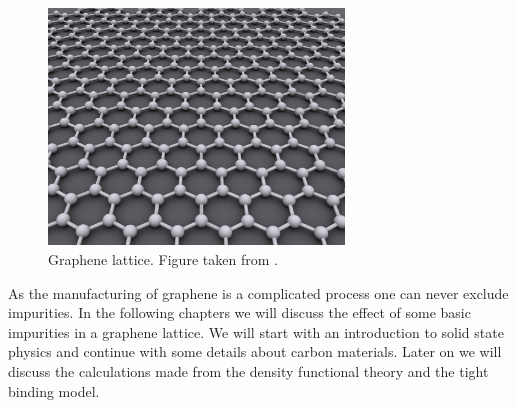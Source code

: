 	\begin{figure}[h]
		\centering
		\includegraphics[width=0.7\textwidth]{figures/Introduction/Graphen.jpg}
		\caption{Graphene lattice. Figure taken from \cite{deWikiGraphen}. }
	\end{figure}	
	\noindent As the manufacturing of graphene is a complicated process one can never exclude impurities. In the following chapters we will discuss the effect of some basic impurities in a graphene lattice. We will start with an introduction to solid state physics and continue with some details about carbon materials. Later on we will discuss the calculations made from the density functional theory and the tight binding model.